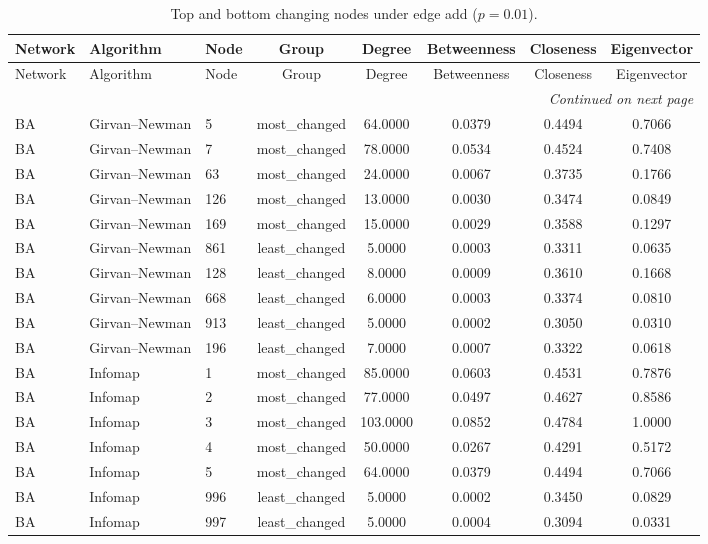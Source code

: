 \begin{longtable}{lllccccc}
\caption{Top and bottom changing nodes under edge add ($p=0.01$).}\label{tab:node_add_p001}\\
\toprule
Network & Algorithm & Node & Group & Degree & Betweenness & Closeness & Eigenvector \\
\midrule
\endfirsthead
\toprule
Network & Algorithm & Node & Group & Degree & Betweenness & Closeness & Eigenvector \\
\midrule
\endhead
\midrule
\multicolumn{8}{r}{\emph{Continued on next page}} \\
\endfoot
\bottomrule
\endlastfoot
BA & Girvan--Newman & 5 & most\_changed & 64.0000 & 0.0379 & 0.4494 & 0.7066 \\
BA & Girvan--Newman & 7 & most\_changed & 78.0000 & 0.0534 & 0.4524 & 0.7408 \\
BA & Girvan--Newman & 63 & most\_changed & 24.0000 & 0.0067 & 0.3735 & 0.1766 \\
BA & Girvan--Newman & 126 & most\_changed & 13.0000 & 0.0030 & 0.3474 & 0.0849 \\
BA & Girvan--Newman & 169 & most\_changed & 15.0000 & 0.0029 & 0.3588 & 0.1297 \\
BA & Girvan--Newman & 861 & least\_changed & 5.0000 & 0.0003 & 0.3311 & 0.0635 \\
BA & Girvan--Newman & 128 & least\_changed & 8.0000 & 0.0009 & 0.3610 & 0.1668 \\
BA & Girvan--Newman & 668 & least\_changed & 6.0000 & 0.0003 & 0.3374 & 0.0810 \\
BA & Girvan--Newman & 913 & least\_changed & 5.0000 & 0.0002 & 0.3050 & 0.0310 \\
BA & Girvan--Newman & 196 & least\_changed & 7.0000 & 0.0007 & 0.3322 & 0.0618 \\
BA & Infomap & 1 & most\_changed & 85.0000 & 0.0603 & 0.4531 & 0.7876 \\
BA & Infomap & 2 & most\_changed & 77.0000 & 0.0497 & 0.4627 & 0.8586 \\
BA & Infomap & 3 & most\_changed & 103.0000 & 0.0852 & 0.4784 & 1.0000 \\
BA & Infomap & 4 & most\_changed & 50.0000 & 0.0267 & 0.4291 & 0.5172 \\
BA & Infomap & 5 & most\_changed & 64.0000 & 0.0379 & 0.4494 & 0.7066 \\
BA & Infomap & 996 & least\_changed & 5.0000 & 0.0002 & 0.3450 & 0.0829 \\
BA & Infomap & 997 & least\_changed & 5.0000 & 0.0004 & 0.3094 & 0.0331 \\

\end{longtable}
